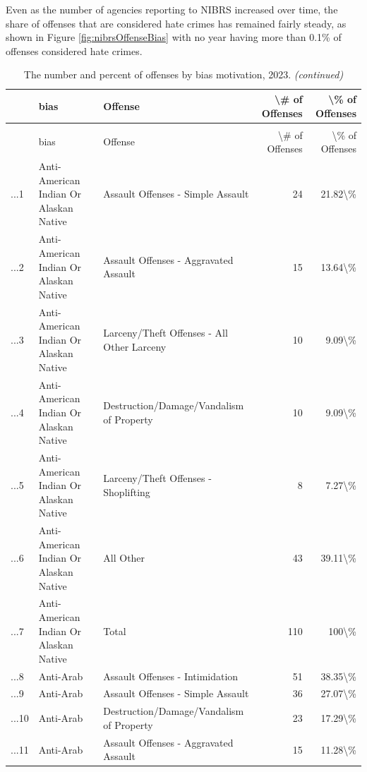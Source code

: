 \documentclass[
]{krantz}
\begin{document}
Even as the number of agencies reporting to NIBRS increased
over time, the share of offenses that are considered hate
crimes has remained fairly steady, as shown in Figure
\ref{fig:nibrsOffenseBias} with no year having more than
0.1\% of offenses considered hate crimes.

\begin{longtable}[t]{l|l|l|r|r}
\caption{\label{tab:offenseBiasOffense}The number and percent of offenses by bias motivation, 2023. }\\
\hline
  & bias & Offense & \textbackslash{}\# of Offenses & \textbackslash{}\% of Offenses\\
\hline
\endfirsthead
\caption[]{\label{tab:offenseBiasOffense}The number and percent of offenses by bias motivation, 2023.  \textit{(continued)}}\\
\hline
  & bias & Offense & \textbackslash{}\# of Offenses & \textbackslash{}\% of Offenses\\
\hline
\endhead
...1 & Anti-American Indian Or Alaskan Native & Assault Offenses - Simple Assault & 24 & 21.82\textbackslash{}\%\\
\hline
...2 & Anti-American Indian Or Alaskan Native & Assault Offenses - Aggravated Assault & 15 & 13.64\textbackslash{}\%\\
\hline
...3 & Anti-American Indian Or Alaskan Native & Larceny/Theft Offenses - All Other Larceny & 10 & 9.09\textbackslash{}\%\\
\hline
...4 & Anti-American Indian Or Alaskan Native & Destruction/Damage/Vandalism of Property & 10 & 9.09\textbackslash{}\%\\
\hline
...5 & Anti-American Indian Or Alaskan Native & Larceny/Theft Offenses - Shoplifting & 8 & 7.27\textbackslash{}\%\\
\hline
...6 & Anti-American Indian Or Alaskan Native & All Other & 43 & 39.11\textbackslash{}\%\\
\hline
...7 & Anti-American Indian Or Alaskan Native & Total & 110 & 100\textbackslash{}\%\\
\hline
...8 & Anti-Arab & Assault Offenses - Intimidation & 51 & 38.35\textbackslash{}\%\\
\hline
...9 & Anti-Arab & Assault Offenses - Simple Assault & 36 & 27.07\textbackslash{}\%\\
\hline
...10 & Anti-Arab & Destruction/Damage/Vandalism of Property & 23 & 17.29\textbackslash{}\%\\
\hline
...11 & Anti-Arab & Assault Offenses - Aggravated Assault & 15 & 11.28\textbackslash{}\%\\

\end{longtable}
\end{document}
